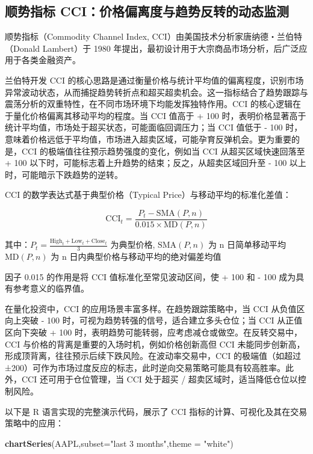 \documentclass[]{ctexbook}
\newenvironment{Shaded}{\begin{snugshade}}{\end{snugshade}}
\newcommand{\AttributeTok}[1]{\textcolor[rgb]{0.13,0.29,0.53}{#1}}
\newcommand{\FunctionTok}[1]{\textcolor[rgb]{0.13,0.29,0.53}{\textbf{#1}}}
\newcommand{\NormalTok}[1]{#1}
\newcommand{\StringTok}[1]{\textcolor[rgb]{0.31,0.60,0.02}{#1}}
\begin{document}
\subsection{顺势指标 CCI：价格偏离度与趋势反转的动态监测}\label{ux987aux52bfux6307ux6807-cciux4ef7ux683cux504fux79bbux5ea6ux4e0eux8d8bux52bfux53cdux8f6cux7684ux52a8ux6001ux76d1ux6d4b}

顺势指标（Commodity Channel Index, CCI）由美国技术分析家唐纳德・兰伯特（Donald Lambert）于 1980 年提出，最初设计用于大宗商品市场分析，后广泛应用于各类金融资产。

兰伯特开发 CCI 的核心思路是通过衡量价格与统计平均值的偏离程度，识别市场异常波动状态，从而捕捉趋势转折点和超买超卖机会。这一指标结合了趋势跟踪与震荡分析的双重特性，在不同市场环境下均能发挥独特作用。CCI 的核心逻辑在于量化价格偏离其移动平均的程度。当 CCI 值高于 + 100 时，表明价格显著高于统计平均值，市场处于超买状态，可能面临回调压力；当 CCI 值低于 - 100 时，意味着价格远低于平均值，市场进入超卖区域，可能孕育反弹机会。更为重要的是，CCI 的极端值往往预示趋势强度的变化，例如当 CCI 从超买区域快速回落至 + 100 以下时，可能标志着上升趋势的结束；反之，从超卖区域回升至 - 100 以上时，可能暗示下跌趋势的逆转。

CCI 的数学表达式基于典型价格（Typical Price）与移动平均的标准化差值：

\[\text{CCI}_t = \frac{P_t - \text{SMA}(P, n)}{\text{0.015} \times \text{MD}(P, n)}\]

其中：\(P_t = \frac{\text{High}_t + \text{Low}_t + \text{Close}_t}{3}\) 为典型价格, \(\text{SMA}(P, n)\) 为 n 日简单移动平均 \(\text{MD}(P, n)\) 为 n 日内典型价格与移动平均的绝对偏差均值

因子 0.015 的作用是将 CCI 值标准化至常见波动区间，使 + 100 和 - 100 成为具有参考意义的临界值。

在量化投资中，CCI 的应用场景丰富多样。在趋势跟踪策略中，当 CCI 从负值区向上突破 - 100 时，可视为趋势转强的信号，适合建立多头仓位；当 CCI 从正值区向下突破 + 100 时，表明趋势可能转弱，应考虑减仓或做空。在反转交易中，CCI 与价格的背离是重要的入场时机，例如价格创新高但 CCI 未能同步创新高，形成顶背离，往往预示后续下跌风险。在波动率交易中，CCI 的极端值（如超过 ±200）可作为市场过度反应的标志，此时逆向交易策略可能具有较高胜率。此外，CCI 还可用于仓位管理，当 CCI 处于超买 / 超卖区域时，适当降低仓位以控制风险。

以下是 R 语言实现的完整演示代码，展示了 CCI 指标的计算、可视化及其在交易策略中的应用：

\begin{Shaded}
\begin{Highlighting}[]
\FunctionTok{chartSeries}\NormalTok{(AAPL,}\AttributeTok{subset=}\StringTok{"last 3 months"}\NormalTok{,}\AttributeTok{theme =} \StringTok{"white"}\NormalTok{)}
\end{Highlighting}
\end{Shaded}
\end{document}
